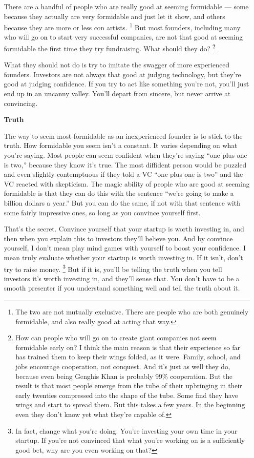 \documentclass[12pt]{book}
\begin{document}
There are a handful of people who are really good at seeming formidable
--- some because they actually are very formidable and just let it show,
and others because they are more or less con artists.
\footnote{The two are not mutually exclusive. There are people who are
both genuinely formidable, and also really good at acting that way.} But most founders, including many who will go on
to start very successful companies, are not that good at seeming
formidable the first time they try fundraising. What should they do?
\footnote{How can people who will go on to create giant companies not seem
formidable early on? I think the main reason is that their experience so
far has trained them to keep their wings folded, as it were. Family,
school, and jobs encourage cooperation, not conquest. And it's just as
well they do, because even being Genghis Khan is probably 99\%
cooperation. But the result is that most people emerge from the tube of
their upbringing in their early twenties compressed into the shape of
the tube. Some find they have wings and start to spread them. But this
takes a few years. In the beginning even they don't know yet what
they're capable of.}

What they should not do is try to imitate the swagger of more
experienced founders. Investors are not always that good at judging
technology, but they're good at judging confidence. If you try to act
like something you're not, you'll just end up in an uncanny valley.
You'll depart from sincere, but never arrive at convincing.

\textbf{Truth}

The way to seem most formidable as an inexperienced founder is to stick
to the truth. How formidable you seem isn't a constant. It varies
depending on what you're saying. Most people can seem confident when
they're saying ``one plus one is two,'' because they know it's true. The
most diffident person would be puzzled and even slightly contemptuous if
they told a VC ``one plus one is two'' and the VC reacted with
skepticism. The magic ability of people who are good at seeming
formidable is that they can do this with the sentence ``we're going to
make a billion dollars a year.'' But you can do the same, if not with
that sentence with some fairly impressive ones, so long as you convince
yourself first.

That's the secret. Convince yourself that your startup is worth
investing in, and then when you explain this to investors they'll
believe you. And by convince yourself, I don't mean play mind games with
yourself to boost your confidence. I mean truly evaluate whether your
startup is worth investing in. If it isn't, don't try to raise money.
\footnote{In fact, change what you're doing. You're investing your own
time in your startup. If you're not convinced that what you're working
on is a sufficiently good bet, why are you even working on that?} But if it is, you'll be telling the truth when
you tell investors it's worth investing in, and they'll sense that. You
don't have to be a smooth presenter if you understand something well and
tell the truth about it.
\end{document}
